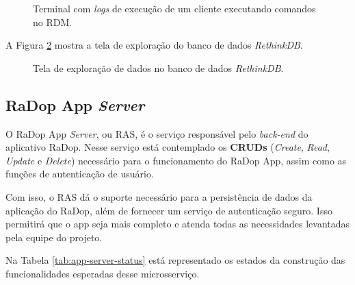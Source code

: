 \begin{figure}[H]
	\caption{\label{fig:rdm-cliente} Terminal com \textit{logs} de execução de um cliente executando comandos no RDM.}
\end{figure}

A Figura  \ref{fig:explorer-rethinkdb} mostra a tela de exploração do banco de dados \textit{RethinkDB}.

\begin{figure}[H]
	\caption{\label{fig:explorer-rethinkdb} Tela de exploração de dados no banco de dados \textit{RethinkDB}.}
\end{figure}

\subsection{RaDop App \textit{Server}}

O RaDop App \textit{Server}, ou RAS, é o serviço responsável pelo \textit{back-end} do aplicativo RaDop. Nesse serviço está contemplado os \textbf{CRUDs} (\textit{Create}, \textit{Read}, \textit{Update} e \textit{Delete}) necessário para o funcionamento do RaDop App, assim como as funções de autenticação de usuário.

Com isso, o RAS dá o suporte necessário para a persistência de dados da aplicação do RaDop, além de fornecer um serviço de autenticação seguro. Isso permitirá que o app seja mais completo e atenda todas as necessidades levantadas pela equipe do projeto.

Na Tabela \ref{tab:app-server-status} está representado os estados da construção das funcionalidades esperadas desse microsserviço. 

